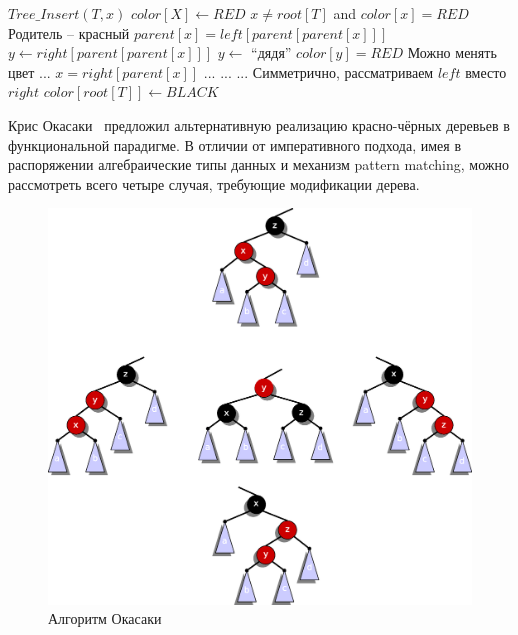 \documentclass[11pt]{article}
\begin{document}
\begin{codebox}
\li $Tree\_Insert(T, x)$
\li $color[X] \gets RED$
\li \While $x \neq root[T]$ and $color[x] = RED$ \Comment Родитель -- красный
\li   \Do \If $parent[x] = left[parent[parent[x]]]$
\li       \Then $y \gets right[parent[parent[x]]]$ \Comment $y \gets $ ``дядя''
\li           \If $color[y] = RED$ \Comment Можно менять цвет
\li           \Then ... 
\li           \Else \If $x = right[parent[x]]$
\li                 \Then ... 
                    \End
\li                 ... 
              \End
\li       \Else ... \Comment Симметрично, рассматриваем $left$ вместо $right$
          \End
      \End
\li $color[root[T]] \gets BLACK$
\end{codebox}

Крис Окасаки~\cite{Okasaki} предложил альтернативную реализацию красно-чёрных деревьев в функциональной парадигме. В отличии от императивного подхода, имея в распоряжении алгебраические типы данных и механизм pattern matching, можно рассмотреть всего четыре случая, требующие модификации дерева.
\begin{figure}[tp]
  \centering
  \includegraphics[width=5in]{lecture10/okasaki.eps}
  \caption{Алгоритм Окасаки}
  \label{fig:okasaki}
\end{figure}
\end{document}
